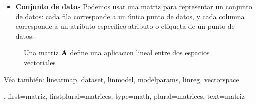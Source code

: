 {{\begin{itemize}
            $$\vu^{(\featureidx)} \mapsto \sum_{\sampleidx=1}^{\samplesize} A_{\sampleidx,\featureidx} \vv^{(\sampleidx)}.$$
            \item {\bf Conjunto de datos} Podemos usar una matriz para representar un conjunto de datos: cada fila 
            corresponde a un único punto de datos, y cada columna corresponde a un atributo específico
            atributo o etiqueta de un punto de datos. 
        \end{itemize}
        \begin{figure}[H]
        \begin{center}
        \end{center}
        \caption{Una matriz ${\bf A}$ define una aplicacion lineal entre dos espacios vectoriales} 
        \end{figure}
        Véa también: \gls{linearmap}, \gls{dataset}, \gls{linmodel}, \gls{modelparams}, \gls{linreg}, \gls{vectorspace} },
    first={matriz},
    firstplural={matrices},
	type=math,
    plural={matrices},
    text={matriz}
}

